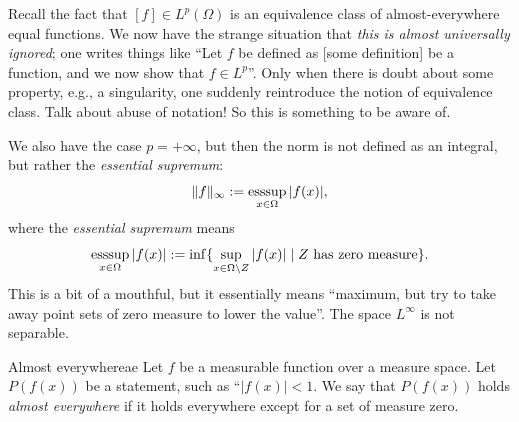 Recall the fact that $[f]\in L^p(\Omega)$ is an equivalence class of almost-everywhere equal functions. We now have the strange situation that \emph{this is almost universally ignored}; one writes things like ``Let $f$ be defined as [some definition] be a function, and we now show that $f \in L^p$''. Only when there is doubt about some property, e.g., a singularity, one suddenly reintroduce the notion of equivalence class. Talk about abuse of notation! So this is something to be aware of.

We also have the case $p = +\infty$, but then the norm is not defined as an integral, but rather the \emph{essential supremum}:
\begin{equation}
    \|f \|_\infty := \operatornamewithlimits{ess sup}_{x\in\Omega} |f(x)|,
\end{equation}
where the \emph{essential supremum} means 
\begin{equation}
    \operatornamewithlimits{ess sup}_{x\in\Omega} |f(x)| := \inf \{ \sup_{x \in \Omega\setminus Z} |f(x)| \mid Z \text{ has zero measure} \}.
\end{equation}
This is a bit of a mouthful, but it essentially means ``maximum, but try to take away point sets of zero measure to lower the value''. The space $L^\infty$ is not separable.

\begin{myDefinition}{Almost everywhere}{ae}
Let $f$ be a measurable function over a measure space. Let $P(f(x))$ be a statement, such as ``$|f(x)|<1$. We say that $P(f(x))$ holds \emph{almost everywhere} if it holds everywhere except for a set of measure zero.
\end{myDefinition}

